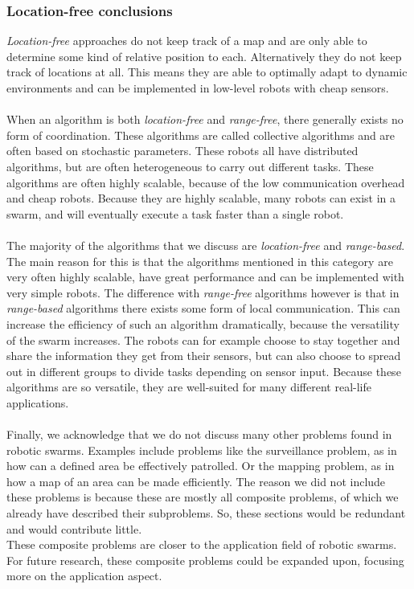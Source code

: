 \subsubsection*{Location-free conclusions} 
\emph{Location-free} approaches do not keep track of a map and are only able to determine some kind of relative position to each.
Alternatively they do not keep track of locations at all. 
This means they are able to optimally adapt to dynamic environments and can be implemented in low-level robots with cheap sensors. \\
\\
When an algorithm is both \emph{location-free} and \emph{range-free}, there generally exists no form of coordination. 
These algorithms are called collective algorithms and are often based on stochastic parameters. 
These robots all have distributed algorithms, but are often heterogeneous to carry out different tasks.
These algorithms are often highly scalable, because of the low communication overhead and cheap robots. 
Because they are highly scalable, many robots can exist in a swarm, and will eventually execute a task faster than a single robot.\\
\\
The majority of the algorithms that we discuss are \emph{location-free} and \emph{range-based}.
The main reason for this is that the algorithms mentioned in this category are very often highly scalable, have great performance and can be implemented with very simple robots. 
The difference with \emph{range-free} algorithms however is that in \emph{range-based} algorithms there exists some form of local communication.
This can increase the efficiency of such an algorithm dramatically, because the versatility of the swarm increases.
The robots can for example choose to stay together and share the information they get from their sensors, but can also choose to spread out in different groups to divide tasks depending on sensor input. 
Because these algorithms are so versatile, they are well-suited for many different real-life applications.\\
\\
Finally, we acknowledge that we do not discuss many other problems found in robotic swarms. 
Examples include problems like the surveillance problem, as in how can a defined area be effectively patrolled. 
Or the mapping problem, as in how a map of an area can be made efficiently. 
The reason we did not include these problems is because these are mostly all composite problems, of which we already have described their subproblems.
So, these sections would be redundant and would contribute little. \\
These composite problems are closer to the application field of robotic swarms.
For future research, these composite problems could be expanded upon, focusing more on the application aspect. 

